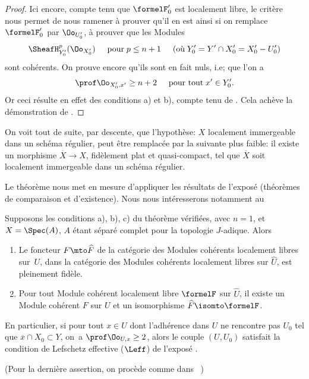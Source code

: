\begin{proof}
\enlargethispage{\baselineskip}%
Ici encore, compte tenu que $\formelF_0'$ est localement libre, le crit\`ere ~ nous permet de nous ramener \`a prouver qu'il en est ainsi si on remplace $\formelF_0'$ par $\Oo_{U'_0}$, \ie \`a prouver que les Modules\pageoriginale
\[
\SheafH^p_{Y_0'}(\Oo_{X_0'}) \hspace{5mm} \text{pour} \; p\leq n+1 \hspace{5mm} \text{(o\`u} \; Y'_0=Y'\cap X_0'=X_0'- U'_0 \text{)}
\]
sont coh\'erents. On prouve encore qu'ils sont en fait nuls, i.e; que l'on a
\steco
\begin{equation} \label{eq:XII.25} {}\prof \Oo_{X'_0, x'} \geq n+2 \hspace{5mm} \text{pour tout} \; x'\in Y'_0.
\end{equation}
Or ceci r\'esulte en effet des conditions a) et b), compte tenu de . Cela ach\`eve la d\'emonstration de .
\skipqed
\end{proof}

\begin{remarque} \label{XII.4.3}
On voit tout de suite, par descente, que l'hypoth\`ese: $X$ localement immergeable dans un sch\'ema r\'egulier, peut \^etre remplac\'ee par la suivante plus faible: il existe un morphisme $\overline{X}\to X$, fid\`element plat et quasi-compact, tel que $\overline{X}$ soit localement immergeable dans un sch\'ema r\'egulier.
\end{remarque}

Le th\'eor\`eme  nous met en mesure d'appliquer les r\'esultats de l'expos\'e  (th\'eor\`emes de comparaison et d'existence). Nous nous int\'eresserons notamment au

\begin{corollaire} \label{XII.4.4}
Supposons les conditions a), b), c) du th\'eor\`eme  v\'erifi\'ees, avec $n=1$, et $X=\Spec(A)$, $A$ \'etant s\'epar\'e complet pour la topologie $J$-adique. Alors
\begin{enumerate}
\item[\textup{1\noo})] Le foncteur $F\mto \widehat{F}$ de la cat\'egorie des Modules coh\'erents localement libres sur~$U$, dans la cat\'egorie des Modules coh\'erents localement libres sur $\widehat{U}$, est pleinement fid\`ele. \item[\textup{2\noo})] Pour tout Module coh\'erent localement libre $\formelF$ sur $\widehat{U}$, il existe un Module coh\'erent $F$ sur $U$ et un isomorphisme $\widehat{F}\isomto \formelF$.
\end{enumerate}
En particulier, si pour tout $x\in U$ dont l'adh\'erence dans $U$ ne rencontre pas $U_0$ \ie tel que $\overline{x}\cap X_0\subset Y$, on~a $\prof \Oo_{U, x}\geq 2$, alors le couple $(U, U_0)$ satisfait la condition de Lefschetz effective ($\Leff$) de l'expos\'e .
\end{corollaire}
\noindent
(Pour la derni\`ere assertion, on proc\`ede comme dans ~)

